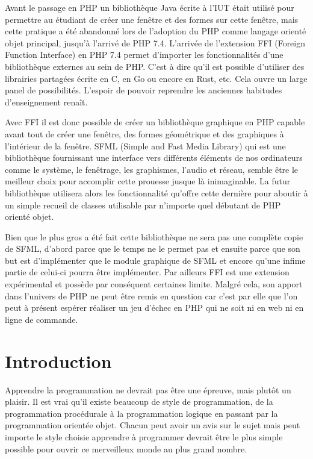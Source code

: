 \documentclass[11pt,a4paper,krantz2,11pt,oneside]{krantz}
\begin{document}
Avant le passage en PHP un bibliothèque Java écrite à l'IUT était utilisé pour permettre au étudiant de créer une fenêtre et des formes sur cette fenêtre, mais cette pratique a été abandonné lors de l'adoption du PHP comme langage orienté objet principal, jusqu'à l'arrivé de PHP 7.4. L'arrivée de l'extension FFI (Foreign Function Interface) en PHP 7.4 permet d'importer les fonctionnalités d'une bibliothèque externes au sein de PHP. C'est à dire qu'il est possible d'utiliser des librairies partagées écrite en C, en Go ou encore en Rust, etc. Cela ouvre un large panel de possibilités. L'espoir de pouvoir reprendre les anciennes habitudes d'enseignement renaît.

Avec FFI il est donc possible de créer un bibliothèque graphique en PHP capable avant tout de créer une fenêtre, des formes géométrique et des graphiques à l'intérieur de la fenêtre. SFML (Simple and Fast Media Library) qui est une bibliothèque fournissant une interface vers différents éléments de nos ordinateurs comme le système, le fenêtrage, les graphismes, l'audio et réseau, semble être le meilleur choix pour accomplir cette prouesse jusque là inimaginable. La futur bibliothèque utilisera alors les fonctionnalité qu'offre cette dernière pour aboutir à un simple recueil de classes utilisable par n'importe quel débutant de PHP orienté objet.

Bien que le plus gros a été fait cette bibliothèque ne sera pas une complète copie de SFML, d'abord parce que le temps ne le permet pas et ensuite parce que son but est d'implémenter que le module graphique de SFML et encore qu'une infime partie de celui-ci pourra être implémenter. Par ailleurs FFI est une extension expérimental et possède par conséquent certaines limite. Malgré cela, son apport dans l'univers de PHP ne peut être remis en question car c'est par elle que l'on peut à présent espérer réaliser un jeu d'échec en PHP qui ne soit ni en web ni en ligne de commande.

\hypertarget{intro}{%
\chapter*{Introduction}\label{intro}}


Apprendre la programmation ne devrait pas être une épreuve, mais plutôt un plaisir. Il est vrai qu'il existe beaucoup de style de programmation, de la programmation procédurale à la programmation logique en passant par la programmation orientée objet. Chacun peut avoir un avis sur le sujet mais peut importe le style choisie apprendre à programmer devrait être le plus simple possible pour ouvrir ce merveilleux monde au plus grand nombre.
\end{document}
